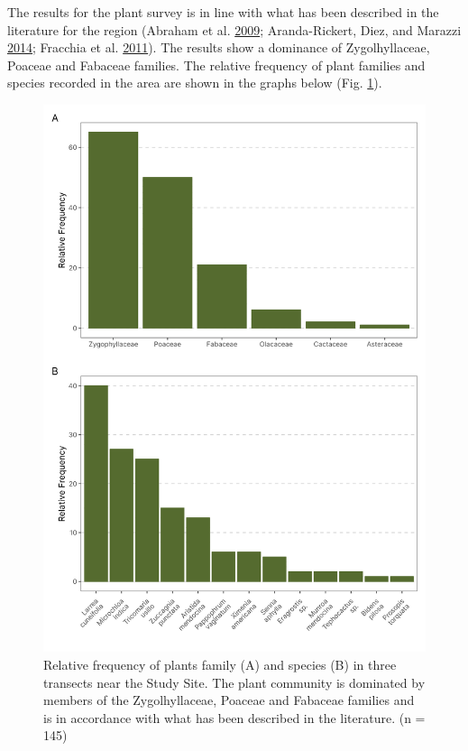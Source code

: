 \documentclass[msc,numbers,hidelinks]{coppe}
\begin{document}
  The results for the plant survey is in line with what has been described in the literature for the region (Abraham et al. \protect\hyperlink{ref-abrahamOverviewGeographyMonte2009}{2009}; Aranda-Rickert, Diez, and Marazzi \protect\hyperlink{ref-aranda-rickertExtrafloralNectarFuels2014}{2014}; Fracchia et al. \protect\hyperlink{ref-fracchiaDispersalArbuscularMycorrhizal2011}{2011}). The results show a dominance of Zygolhyllaceae, Poaceae and Fabaceae families. The relative frequency of plant families and species recorded in the area are shown in the graphs below (Fig. \ref{fig:appendix-plants}).
  \begin{figure}
  \includegraphics[width=1\linewidth]{../04_figures/plants/plant_frequency} \caption{Relative frequency of plants family (A) and species (B) in three transects near the Study Site. The plant community is dominated by members of the Zygolhyllaceae, Poaceae and Fabaceae families and is in accordance with what has been described in the literature. (n = 145)}\label{fig:appendix-plants}
  \end{figure}
\end{document}
